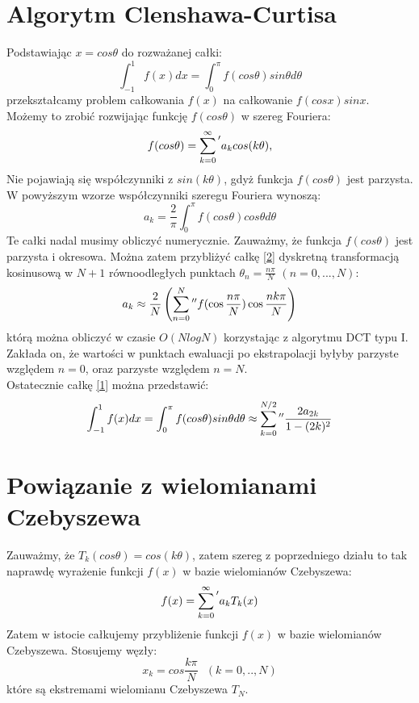 \documentclass[11pt,wide]{mwart}
\begin{document}
\section{Algorytm Clenshawa-Curtisa}
Podstawiając $x = cos \theta $ do rozważanej całki:
$$\int_{-1}^1 f(x) dx = \int_0^\pi f(cos \theta) sin \theta d \theta$$
przekształcamy problem całkowania $f(x)$ na całkowanie $f(cos x) sin x$. 
Możemy to zrobić rozwijając funkcję $f(cos \theta)$ w szereg Fouriera:
$$f(cos \theta) = \sum_{k=0}^{\infty}{\vphantom{\sum}}' a_k cos(k \theta) \text{,}$$
Nie pojawiają się współczynniki z $sin(k\theta)$, gdyż funkcja $f(cos\theta)$ jest parzysta.
W powyższym wzorze współczynniki szeregu Fouriera wynoszą:
\begin{equation}
    a_k = \frac{2}{\pi} \int_0^\pi f(cos \theta) cos \theta d \theta \label{2}
\end{equation}
Te całki nadal musimy obliczyć numerycznie. Zauważmy, że funkcja $f(cos \theta)$ jest parzysta i okresowa.
Można zatem przybliżyć całkę \eqref{2} dyskretną transformacją kosinusową w $N+1$ równoodległych punktach
$\theta_n = \frac{n\pi}{N}$ $(n=0, ..., N)$:
$$a_k \approx \frac{2}{N}\left(\sum_{n=0}^{N}{\vphantom{\sum}}{''} f(\cos\frac{n\pi}N) \cos\frac{n k \pi}N \right)$$
którą można obliczyć w czasie $O(N log N)$ korzystając z algorytmu DCT typu I.\\
Zakłada on, że wartości w punktach ewaluacji po ekstrapolacji byłyby parzyste \\względem $n=0$, oraz parzyste względem $n=N$.\\
Ostatecznie całkę \eqref{1} można przedstawić:
$$\int_{-1}^1 f(x) dx = \int_0^\pi f(cos \theta) sin \theta d \theta \approx \sum_{k=0}^{N/2}{\vphantom{\sum}}{''} \frac{2 a_{2k}}{1-(2k)^2}$$

\section{Powiązanie z wielomianami Czebyszewa}
Zauważmy, że $T_k(cos \theta) = cos(k \theta)$, zatem szereg z poprzedniego działu to tak naprawdę
wyrażenie funkcji $f(x)$ w bazie wielomianów Czebyszewa:
$$f(x) = \sum_{k=0}^{\infty}{\vphantom{\sum}}' a_k T_k(x)$$
Zatem w istocie całkujemy przybliżenie funkcji $f(x)$ w bazie wielomianów Czebyszewa. Stosujemy węzły:
$$x_k = cos \frac{k \pi}N \text{ } (k=0, .., N)$$
które są ekstremami wielomianu Czebyszewa $T_N$.
\end{document}

